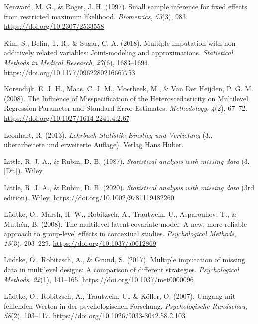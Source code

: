 \documentclass[
  letterpaper,
  11pt,
  english,
  singlespacing,
  headsepline,
  openany]{MastersDoctoralThesis}
\newlength{\cslhangindent}
\newenvironment{CSLReferences}[2] %
 {\begin{list}{}{%
  \setlength{\itemindent}{0pt}
  \setlength{\leftmargin}{0pt}
  \setlength{\parsep}{0pt}
  \ifodd #1
   \setlength{\leftmargin}{\cslhangindent}
   \setlength{\itemindent}{-1\cslhangindent}
  \fi
  \setlength{\itemsep}{#2\baselineskip}}}
 {\end{list}}
\begin{document}
\begin{CSLReferences}{1}{0}
Kenward, M. G., \& Roger, J. H. (1997). Small sample inference for fixed
effects from restricted maximum likelihood. \emph{Biometrics},
\emph{53}(3), 983. \url{https://doi.org/10.2307/2533558}

Kim, S., Belin, T. R., \& Sugar, C. A. (2018). Multiple imputation with
non-additively related variables: {Joint-modeling} and approximations.
\emph{Statistical Methods in Medical Research}, \emph{27}(6),
1683--1694. \url{https://doi.org/10.1177/0962280216667763}

Korendijk, E. J. H., Maas, C. J. M., Moerbeek, M., \& Van Der Heijden,
P. G. M. (2008). The {Influence} of {Misspecification} of the
{Heteroscedasticity} on {Multilevel Regression Parameter} and {Standard
Error Estimates}. \emph{Methodology}, \emph{4}(2), 67--72.
\url{https://doi.org/10.1027/1614-2241.4.2.67}

Leonhart, R. (2013). \emph{{Lehrbuch Statistik: Einstieg und
Vertiefung}} (3., überarbeitete und erweiterte Auflage). Verlag Hans
Huber.

Little, R. J. A., \& Rubin, D. B. (1987). \emph{Statistical analysis
with missing data} (3. {[}Dr.{]}). Wiley.

Little, R. J. A., \& Rubin, D. B. (2020). \emph{Statistical analysis
with missing data} (3rd edition). Wiley.
\url{https://doi.org/10.1002/9781119482260}

Lüdtke, O., Marsh, H. W., Robitzsch, A., Trautwein, U., Asparouhov, T.,
\& Muthén, B. (2008). The multilevel latent covariate model: {A} new,
more reliable approach to group-level effects in contextual studies.
\emph{Psychological Methods}, \emph{13}(3), 203--229.
\url{https://doi.org/10.1037/a0012869}

Lüdtke, O., Robitzsch, A., \& Grund, S. (2017). Multiple imputation of
missing data in multilevel designs: A comparison of different
strategies. \emph{Psychological Methods}, \emph{22}(1), 141--165.
\url{https://doi.org/10.1037/met0000096}

Lüdtke, O., Robitzsch, A., Trautwein, U., \& Köller, O. (2007). {Umgang
mit fehlenden Werten in der psychologischen Forschung}.
\emph{Psychologische Rundschau}, \emph{58}(2), 103--117.
\url{https://doi.org/10.1026/0033-3042.58.2.103}


\end{CSLReferences}
\end{document}
